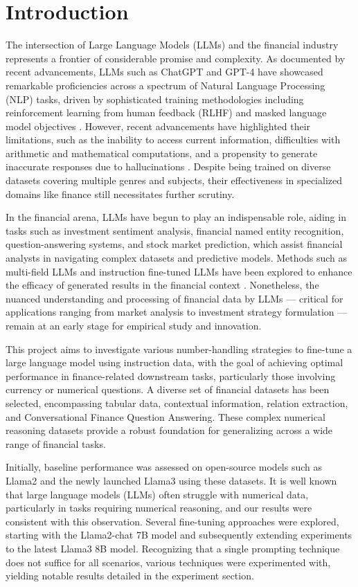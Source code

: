 \documentclass[logo,msc]{infthesis}           %
\begin{document}
\chapter{Introduction}

The intersection of Large Language Models (LLMs) and the financial industry represents a frontier of considerable promise and complexity. As documented by recent advancements, LLMs such as ChatGPT and GPT-4 have showcased remarkable proficiencies across a spectrum of Natural Language Processing (NLP) tasks, driven by sophisticated training methodologies including reinforcement learning from human feedback (RLHF) and masked language model objectives \cite{li2023chatgpt}. However, recent advancements have highlighted their limitations, such as the inability to access current information, difficulties with arithmetic and mathematical computations, and a propensity to generate inaccurate responses due to hallucinations \cite{schick2023toolformer,li2024dawn}. Despite being trained on diverse datasets covering multiple genres and subjects, their effectiveness in specialized domains like finance still necessitates further scrutiny.

In the financial arena, LLMs have begun to play an indispensable role, aiding in tasks such as investment sentiment analysis, financial named entity recognition, question-answering systems, and stock market prediction, which assist financial analysts in navigating complex datasets and predictive models. Methods such as multi-field LLMs and instruction fine-tuned LLMs have been explored to enhance the efficacy of generated results in the financial context \cite{lee2024survey}. Nonetheless, the nuanced understanding and processing of financial data by LLMs — critical for applications ranging from market analysis to investment strategy formulation — remain at an early stage for empirical study and innovation.

This project aims to investigate various number-handling strategies to fine-tune a large language model using instruction data, with the goal of achieving optimal performance in finance-related downstream tasks, particularly those involving currency or numerical questions. A diverse set of financial datasets has been selected, encompassing tabular data, contextual information, relation extraction, and Conversational Finance Question Answering. These complex numerical reasoning datasets provide a robust foundation for generalizing across a wide range of financial tasks.

Initially, baseline performance was assessed on open-source models such as Llama2 and the newly launched Llama3 using these datasets. It is well known that large language models (LLMs) often struggle with numerical data, particularly in tasks requiring numerical reasoning, and our results were consistent with this observation. Several fine-tuning approaches were explored, starting with the Llama2-chat 7B model and subsequently extending experiments to the latest Llama3 8B model. Recognizing that a single prompting technique does not suffice for all scenarios, various techniques were experimented with, yielding notable results detailed in the experiment section.
\end{document}

